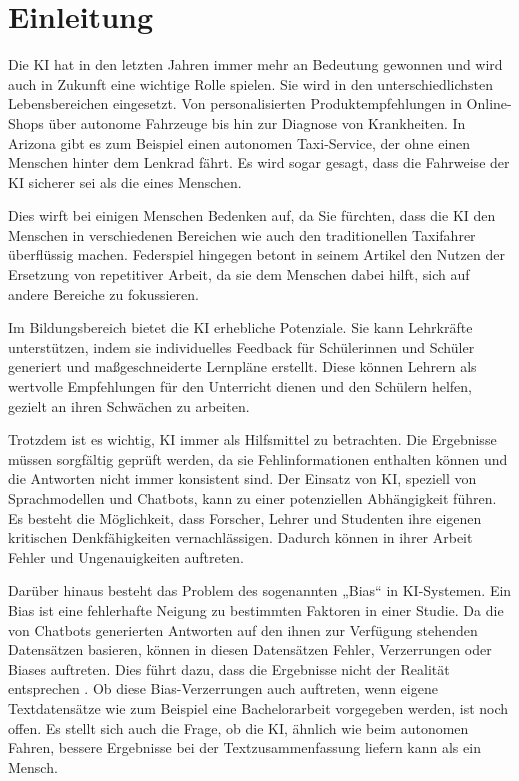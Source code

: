 \chapter{Einleitung}
\label{einleitung}
Die \ac{KI} hat in den letzten Jahren immer mehr an Bedeutung gewonnen und wird auch in Zukunft eine wichtige Rolle spielen. Sie wird in den unterschiedlichsten Lebensbereichen eingesetzt. Von personalisierten Produktempfehlungen in Online-Shops über autonome Fahrzeuge bis hin zur Diagnose von Krankheiten. In Arizona gibt es zum Beispiel einen autonomen Taxi-Service, der ohne einen Menschen hinter dem Lenkrad fährt. Es wird sogar gesagt, dass die Fahrweise der \ac{KI} sicherer sei als die eines Menschen. \cite{gibbs2017google}

Dies wirft bei einigen Menschen Bedenken auf, da Sie fürchten, dass die \ac{KI} den Menschen in verschiedenen Bereichen wie auch den traditionellen Taxifahrer überflüssig machen. Federspiel hingegen betont in seinem Artikel den Nutzen der Ersetzung von repetitiver Arbeit, da sie dem Menschen dabei hilft, sich auf andere Bereiche zu fokussieren. \cite{Federspiele010435}

Im Bildungsbereich bietet die \ac{KI} erhebliche Potenziale. Sie kann Lehrkräfte unterstützen, indem sie individuelles Feedback für Schülerinnen und Schüler generiert und maßgeschneiderte Lernpläne erstellt. Diese können Lehrern als wertvolle Empfehlungen für den Unterricht dienen und den Schülern helfen, gezielt an ihren Schwächen zu arbeiten. \cite[S.3 ff.]{fraiwan2023reviewchatgptapplicationseducation} 

Trotzdem ist es wichtig, \ac{KI} immer als Hilfsmittel zu betrachten. Die Ergebnisse müssen sorgfältig geprüft werden, da sie Fehlinformationen enthalten können und die Antworten nicht immer konsistent sind. Der Einsatz von \ac{KI}, speziell von Sprachmodellen und Chatbots, kann zu einer potenziellen Abhängigkeit führen. Es besteht die Möglichkeit, dass Forscher, Lehrer und Studenten ihre eigenen kritischen Denkfähigkeiten vernachlässigen. Dadurch können in ihrer Arbeit Fehler und Ungenauigkeiten auftreten. \cite[S.10 ff.]{fraiwan2023reviewchatgptapplicationseducation}

Darüber hinaus besteht das Problem des sogenannten „Bias“ in \ac{KI}-Systemen. Ein Bias ist eine fehlerhafte Neigung zu bestimmten Faktoren in einer Studie. Da die von Chatbots generierten Antworten auf den ihnen zur Verfügung stehenden Datensätzen basieren, können in diesen Datensätzen Fehler, Verzerrungen oder Biases auftreten. Dies führt dazu, dass die Ergebnisse nicht der Realität entsprechen \cite[S.3 ff.]{anslinger2021faire}. Ob diese Bias-Verzerrungen auch auftreten, wenn eigene Textdatensätze wie zum Beispiel eine Bachelorarbeit vorgegeben werden, ist noch offen. Es stellt sich auch die Frage, ob die \ac{KI}, ähnlich wie beim autonomen Fahren, bessere Ergebnisse bei der Textzusammenfassung liefern kann als ein Mensch.

